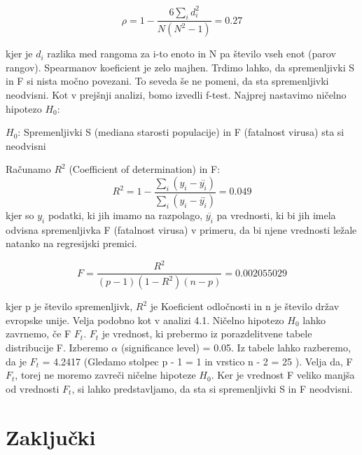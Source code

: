 \documentclass[a4paper,11pt]{article}
\begin{document}
\begin{center}
\[\rho = 1 - \frac{6\sum_{i}{}d_i^2}{N(N^2 - 1)} = 0.27\]
\end{center} 
kjer je \( d_i \) razlika med rangoma za i-to enoto in N pa število vseh enot (parov rangov).
Spearmanov koeficient je zelo majhen. Trdimo lahko, da spremenljivki S in F si nista močno povezani. To seveda še ne pomeni, da sta spremenljivki neodvisni.  Kot v prejšnji analizi, bomo izvedli f-test. Najprej nastavimo ničelno hipotezo \( H_0 \):
\begin{center}
\( H_0 \): Spremenljivki S (mediana starosti populacije) in F (fatalnost virusa) sta si neodvisni
\end{center}
Računamo \( R^2 \) (Coefficient of determination) in F:
\[R^2 = 1 - \frac{\sum_{i}{}(y_i - \overset{..}{y_i})}{\sum_{i}{}(y_i - \overset{-}{y_i})} = 0.049\]
kjer so \(y_i\) podatki, ki jih imamo na razpolago, \(\overset{..}{y_i}\) pa vrednosti, ki bi jih imela odvisna spremenljivka F (fatalnost virusa) v primeru, da bi njene vrednosti ležale natanko na regresijski premici.

\[F = \frac{R^2}{(p - 1)(1 - R^2)(n - p)} = 0.002055029 \]

kjer p je število spremenljivk, \( R^2 \) je Koeficient odločnosti in n je število držav evropske unije. Velja podobno kot v analizi 4.1. Ničelno hipotezo \( H_0 \) lahko zavrnemo, če F \ge \(F_t \). \(F_t\) je vrednost, ki prebermo iz porazdelitvene tabele distribucije F. Izberemo \(\alpha\) (significance level) = 0.05. Iz tabele lahko razberemo, da je \( F_t \) = 4.2417 (Gledamo stolpec p - 1 = 1 in vrstico n - 2 = 25 ). Velja da, F \lt \(F_t\), torej ne moremo zavreči ničelne hipoteze \(H_0\). Ker je vrednost F veliko manjša od vrednosti \(F_t\), si lahko predstavljamo, da sta si spremenljivki S in F neodvisni.

\section{Zaključki}
\end{document}
